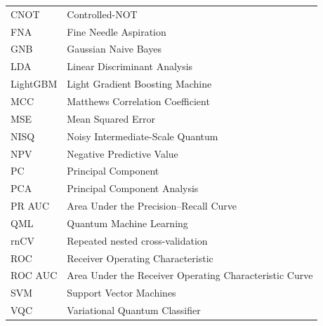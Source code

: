 \documentclass[en]{dimscthesis}
\begin{document}
\abbreviations
\begin{center}
	\renewcommand{\arraystretch}{1.5}
	\begin{longtable}{ l @{\qquad} l }
		\toprule
		CNOT     & Controlled-NOT \\
		FNA      & Fine Needle Aspiration \\
		GNB      & Gaussian Naive Bayes \\
		LDA      & Linear Discriminant Analysis \\
		LightGBM & Light Gradient Boosting Machine \\
		MCC      & Matthews Correlation Coefficient \\
		MSE      & Mean Squared Error \\
		NISQ     & Noisy Intermediate-Scale Quantum \\
		NPV      & Negative Predictive Value \\
		PC       & Principal Component \\
		PCA      & Principal Component Analysis \\
		PR AUC   & Area Under the Precision--Recall Curve \\
		QML      & Quantum Machine Learning \\
		rnCV     & Repeated nested cross-validation \\
		ROC      & Receiver Operating Characteristic \\
		ROC AUC  & Area Under the Receiver Operating Characteristic Curve \\
		SVM      & Support Vector Machines \\
		VQC      & Variational Quantum Classifier \\
		\bottomrule
	\end{longtable}
\end{center}


\end{document}
